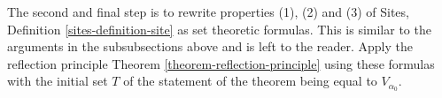 \medskip\noindent
The second and final step is to rewrite
properties (1), (2) and (3) of Sites,
Definition \ref{sites-definition-site} as set theoretic formulas.
This is similar to the arguments in the subsubsections above and is
left to the reader. Apply the reflection
principle Theorem \ref{theorem-reflection-principle} using these formulas
with the initial set $T$ of the statement of the theorem being equal to
$V_{\alpha_0}$.








